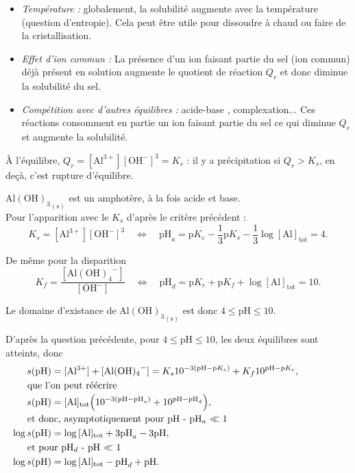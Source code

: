 \begin{solution}
\begin{questions}
    \questioncours
    \begin{itemize}
        \item \emph{Température :} globalement, la solubilité augmente avec la température (question d'entropie). Cela peut être utile pour dissoudre à chaud ou faire de la cristallisation.
        
        \item \emph{Effet d'ion commun :} La présence d'un ion faisant partie du sel (ion commun) déjà présent en solution augmente le quotient de réaction $Q_r$ et donc diminue la solubilité du sel.
        
        \item \emph{Compétition avec d'autres équilibres :} acide-base , complexation... Ces réactions consomment en partie un ion faisant partie du sel ce qui diminue $Q_r$ et augmente la solubilité.
        
        \end{itemize}
    
    \question À l'équilibre, $Q_r = \mathrm{[Al^{3+}][OH^-]^3} = K_s$ : il y a précipitation si $Q_r > K_s$, en deçà, c'est rupture d'équilibre.
    
    \question $\mathrm{{Al{(OH)}_3}_{(s)}}$ est un amphotère, à la fois acide et base. \\
    Pour l'apparition avec le $K_s$ d'après le critère précédent :
    $$K_s = \mathrm{[Al^{3+}][OH^-]^3} \quad \Longleftrightarrow \quad \text{pH}_a = \text{p}K_e - \dfrac{1}{3}\text{p}K_s - \dfrac{1}{3}\log\mathrm{[Al]_{tot}} = 4.$$
    
    De même pour la disparition
    $$K_f = \mathrm{\dfrac{[{Al(OH)_4}^-]}{[OH^-]}} \quad \Longleftrightarrow \quad \text{pH}_d = \text{p}K_e + \text{p}K_f + \log\mathrm{[Al]_{tot}} = 10.$$
    
    Le domaine d'existance de $\mathrm{{Al{(OH)}_3}_{(s)}}$ est donc $4 \leqslant \text{pH} \leqslant 10$.
    
    \question D'après la question précédente, pour $4 \leqslant \text{pH} \leqslant 10$, les deux équilibres sont atteints, donc
    \begin{align*}
        s(\text{pH}) &= \mathrm{[Al^{3+}] + [{Al(OH)_4}^-]} = K_s 10^{-3(\text{pH} - \text{p}K_e)} + K_f 10^{\text{pH} - \text{p}K_e}, \\
        \noalign{que l'on peut réécrire}
        s(\text{pH}) &= \mathrm{[Al]_{tot}}\qty(10^{-3(\text{pH} - \text{pH}_a)} + 10^{\text{pH} - \text{pH}_d}), \\
        \noalign{et donc, asymptotiquement pour pH - pH$_a$ $\ll$ 1}
        \log s(\text{pH}) &= \log\mathrm{[Al]_{tot}} + 3 \text{pH}_a - 3 \text{pH}, \\
        \noalign{et pour pH$_d$ - pH $\ll$ 1}
        \log s(\text{pH}) &= \log\mathrm{[Al]_{tot}} - \text{pH}_d + \text{pH}.
    \end{align*}
    

\end{questions}
\end{solution}
